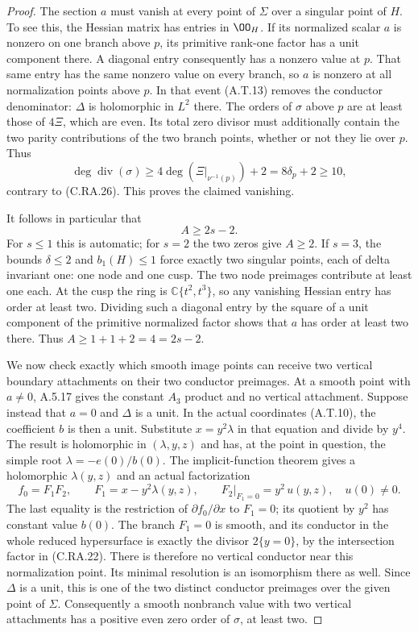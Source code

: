 \begin{proof}
The section $a$ must vanish at every point of $\Sigma$
over a singular point of $H$. To see this, the Hessian
matrix has entries in $\OO_H$. If its normalized scalar
$a$ is nonzero on one branch above $p$, its primitive
rank-one factor has a unit component there. A diagonal
entry consequently has a nonzero value at $p$. That
same entry has the same nonzero value on every branch,
so $a$ is nonzero at all normalization points above $p$.
In that event (A.T.13) removes the conductor denominator:
$\Delta$ is holomorphic in $L^2$ there. The orders of
$\sigma$ above $p$ are at least those of $4\Xi$,
which are even. Its total zero divisor must additionally
contain the two parity contributions of the two branch
points, whether or not they lie over $p$. Thus
\[
 \deg\operatorname{div}(\sigma)
       \ge4\deg(\Xi|_{\nu^{-1}(p)})+2
       =8\delta_p+2\ge10,
\tag{C.RA.27}
\]
contrary to (C.RA.26). This proves the claimed vanishing.

It follows in particular that
\[
                              A\ge2s-2.
\tag{C.RA.28}
\]
For $s\le1$ this is automatic; for $s=2$ the two
zeros give $A\ge2$. If $s=3$, the bounds
$\delta\le2$ and $b_1(H)\le1$ force exactly two
singular points, each of delta invariant one: one node
and one cusp. The two node preimages contribute at
least one each. At the cusp the ring is
$\mathbb C\{t^2,t^3\}$, so any vanishing Hessian entry
has order at least two. Dividing such a diagonal entry
by the square of a unit component of the primitive
normalized factor shows that $a$ has order at least
two there. Thus $A\ge1+1+2=4=2s-2$.

We now check exactly which smooth image points can
receive two vertical boundary attachments on their two
conductor preimages. At a smooth point with $a\ne0$,
A.5.17 gives the constant $A_3$ product and no vertical
attachment. Suppose instead that $a=0$ and $\Delta$
is a unit. In the actual coordinates (A.T.10), the
coefficient $b$ is then a unit. Substitute $x=y^2\lambda$
in that equation and divide by $y^4$. The result is
holomorphic in $(\lambda,y,z)$ and has, at the point
in question, the simple root
$\lambda=-e(0)/b(0)$. The implicit-function theorem
gives a holomorphic $\lambda(y,z)$ and an actual
factorization
\[
 f_0=F_1F_2,\qquad
 F_1=x-y^2\lambda(y,z),\qquad
 F_2|_{F_1=0}=y^2\,u(y,z),\quad u(0)\ne0.
\tag{C.RA.29}
\]
The last equality is the restriction of
$\partial f_0/\partial x$ to $F_1=0$; its quotient
by $y^2$ has constant value $b(0)$.
The branch $F_1=0$ is smooth, and its conductor in the
whole reduced hypersurface is exactly the divisor
$2\{y=0\}$, by the intersection factor in
(C.RA.22). There is therefore no vertical conductor
near this normalization point. Its minimal resolution
is an isomorphism there as well. Since $\Delta$ is a
unit, this is one of the two distinct conductor
preimages over the given point of $\Sigma$.
Consequently a smooth nonbranch value with two vertical
attachments has a positive even zero order of $\sigma$,
at least two.


\end{proof}
